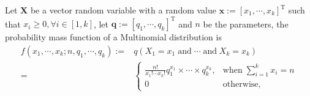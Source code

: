 \begin{defn}
Let $\mathbf{X}$ be a vector random variable with a random value $\mathbf{x}:=[x_1,\cdots,x_k]^{\text{T}}$ such that $x_i\geq 0,\forall i \in[1,k]$, let $\boldsymbol{q}:=[q_1,\cdots,q_k]^{\text{T}}$ and $n$ be the parameters, the probability mass function of a Multinomial distribution is 
\begin{align}
    f(x_1,\cdots,x_k;n,q_1,\cdots,q_k):=& q(X_1=x_1\;\text{and}\;\cdots\;\text{and}\;X_k=x_k)\nonumber\\
    =&\begin{cases}
        \displaystyle\frac{n!}{x_1!\cdots x_k!}q_1^{x_1}\times\cdots\times q_k^{x_k},&\text{when}\;\sum_{i=1}^kx_i=n\\
        0&\text{otherwise},
    \end{cases}
\end{align}
\end{defn}